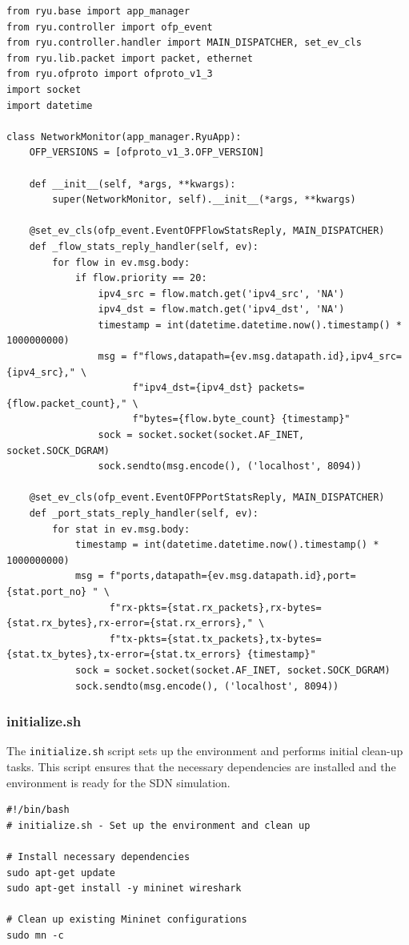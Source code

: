 \documentclass[a4paper,12pt]{article}
\begin{document}
\begin{verbatim}
from ryu.base import app_manager
from ryu.controller import ofp_event
from ryu.controller.handler import MAIN_DISPATCHER, set_ev_cls
from ryu.lib.packet import packet, ethernet
from ryu.ofproto import ofproto_v1_3
import socket
import datetime

class NetworkMonitor(app_manager.RyuApp):
    OFP_VERSIONS = [ofproto_v1_3.OFP_VERSION]

    def __init__(self, *args, **kwargs):
        super(NetworkMonitor, self).__init__(*args, **kwargs)

    @set_ev_cls(ofp_event.EventOFPFlowStatsReply, MAIN_DISPATCHER)
    def _flow_stats_reply_handler(self, ev):
        for flow in ev.msg.body:
            if flow.priority == 20:
                ipv4_src = flow.match.get('ipv4_src', 'NA')
                ipv4_dst = flow.match.get('ipv4_dst', 'NA')
                timestamp = int(datetime.datetime.now().timestamp() * 1000000000)
                msg = f"flows,datapath={ev.msg.datapath.id},ipv4_src={ipv4_src}," \
                      f"ipv4_dst={ipv4_dst} packets={flow.packet_count}," \
                      f"bytes={flow.byte_count} {timestamp}"
                sock = socket.socket(socket.AF_INET, socket.SOCK_DGRAM)
                sock.sendto(msg.encode(), ('localhost', 8094))

    @set_ev_cls(ofp_event.EventOFPPortStatsReply, MAIN_DISPATCHER)
    def _port_stats_reply_handler(self, ev):
        for stat in ev.msg.body:
            timestamp = int(datetime.datetime.now().timestamp() * 1000000000)
            msg = f"ports,datapath={ev.msg.datapath.id},port={stat.port_no} " \
                  f"rx-pkts={stat.rx_packets},rx-bytes={stat.rx_bytes},rx-error={stat.rx_errors}," \
                  f"tx-pkts={stat.tx_packets},tx-bytes={stat.tx_bytes},tx-error={stat.tx_errors} {timestamp}"
            sock = socket.socket(socket.AF_INET, socket.SOCK_DGRAM)
            sock.sendto(msg.encode(), ('localhost', 8094))
\end{verbatim}

\subsubsection{initialize.sh}
The \texttt{initialize.sh} script sets up the environment and performs initial clean-up tasks. This script ensures that the necessary dependencies are installed and the environment is ready for the SDN simulation.

\begin{verbatim}
#!/bin/bash
# initialize.sh - Set up the environment and clean up

# Install necessary dependencies
sudo apt-get update
sudo apt-get install -y mininet wireshark

# Clean up existing Mininet configurations
sudo mn -c
\end{verbatim}
\end{document}
